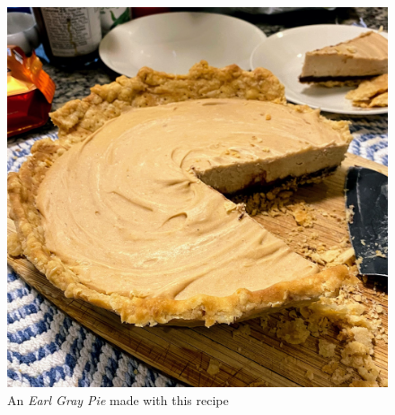 \documentclass[12pt]{article}
\begin{document}
\begin{multicols}{2}
    \begin{figure}[H]
        \includegraphics[width=\linewidth]{assets/earl_gray_pie.jpg}
        \centering
        \caption{An \textit{Earl Gray Pie} made with this recipe}
    \end{figure}
\end{multicols}

\newpage
\end{document}
